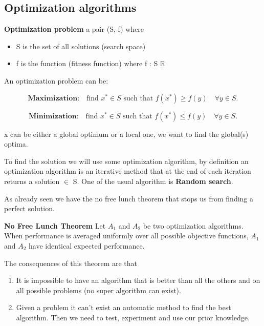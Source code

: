 \subsection{Optimization algorithms}

\textbf{Optimization problem} \ra a pair (S, f) where

\begin{itemize}
    \item S is the set of all solutions (search space)
    \item f is the function (fitness function) where f : S \ra \begin{math}
        \mathbb{R} 
    \end{math}
\end{itemize}

An optimization problem can be:

\[
\textbf{Maximization:} \quad \text{find } x^\ast \in S \text{ such that } 
f(x^\ast) \geq f(y) \quad \forall y \in S.
\]

\[
\textbf{Minimization:} \quad \text{find } x^\ast \in S \text{ such that } 
f(x^\ast) \leq f(y) \quad \forall y \in S.
\]

x can be either a global optimum or a local one, we want to find the global(s) optima.

\vspace{10pt}

To find the solution we will use some optimization algorithm, by definition an optimization algorithm is an iterative method that at the end of each iteration returns a solution \begin{math}
    \in 
\end{math} S. One of the usual algorithm is \textbf{Random search}. 

As already seen we have the no free lunch theorem that stops us from finding a perfect solution. 

\vspace{10pt}
\textbf{No Free Lunch Theorem} \ra 
Let $A_1$ and $A_2$ be two optimization algorithms. 
When performance is averaged uniformly over all possible objective functions, 
$A_1$ and $A_2$ have identical expected performance.

\vspace{10pt}

The consequences of this theorem are that
\begin{enumerate}
    \item It is impossible to have an algorithm that is better than all the others and on all possible problems (no super algorithm can exist).
    \item Given a problem it can't exist an automatic method to find the best algorithm. Then we need to test, experiment and use our prior knowledge.
\end{enumerate}

